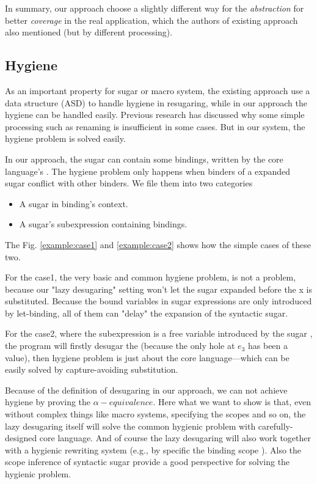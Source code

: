In summary, our approach choose a slightly different way for the \emph{abstraction} for better \emph{coverage} in the real application, which the authors of existing approach also mentioned (but by different processing).


\subsection{Hygiene}

As an important property for sugar or macro system, the existing approach use a data structure (ASD) to handle hygiene in resugaring, while in our approach the hygiene can be handled easily. Previous research\cite{EssenceofHygiene} has discussed why some simple processing such as renaming is insufficient in some cases. But in our system, the hygiene problem is solved easily. 

In our approach, the sugar can contain some bindings, written by the core language's . The hygiene problem only happens when binders of a expanded sugar conflict with other binders. We file them into two categories
\begin{itemize}
\item A sugar in binding's context.
\item A sugar's subexpression containing bindings.
\end{itemize}
The Fig.  \ref{example:case1} and \ref{example:case2} shows how the simple cases of these two.


For the case1, the very basic and common hygiene problem, is not a problem, because our "lazy desugaring" setting won't let the sugar  expanded before the x is substituted. Because the bound variables in sugar expressions are only introduced by let-binding, all of them can "delay" the expansion of the syntactic sugar.

For the case2, where the subexpression  is a free variable introduced by the sugar , the program will firstly desugar the  (because the only hole at $e_3$ has been a value), then hygiene problem is just about the core language---which can be easily solved by capture-avoiding substitution.

Because of the definition of desugaring in our approach, we can not achieve hygiene by proving the $\alpha-equivalence$.
Here what we want to show is that, even without complex things like macro systems, specifying the scopes and so on, the lazy desugaring itself will solve the common hygienic problem with carefully-designed core language. And of course the lazy desugaring will also work together with a hygienic rewriting system (e.g., by specific the binding scope \cite{10.5555/1792878.1792884}). Also the scope inference of syntactic sugar\cite{resugaringscope} provide a good perspective for solving the hygienic problem.
